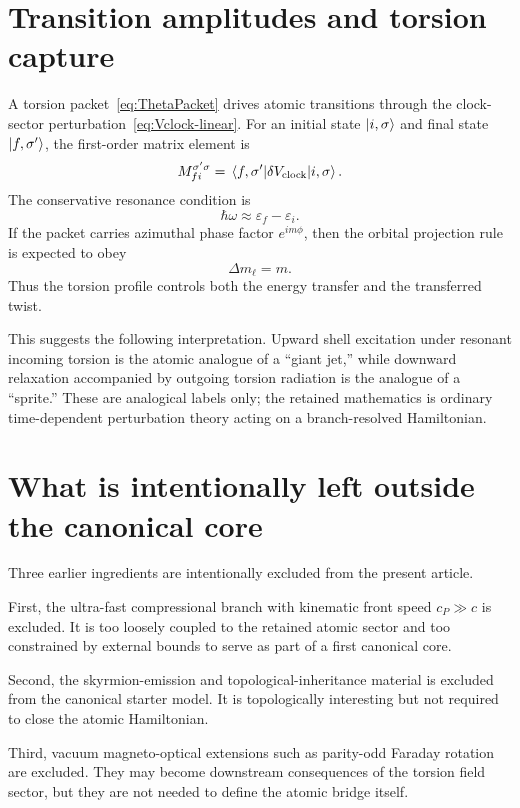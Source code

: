 \documentclass[11pt,a4paper]{article}
\begin{document}
\section{Transition amplitudes and torsion capture}
A torsion packet~\eqref{eq:ThetaPacket} drives atomic transitions through the clock-sector perturbation~\eqref{eq:Vclock-linear}. For an initial state $\ket{i,\sigma}$ and final state $\ket{f,\sigma'}$, the first-order matrix element is
\begin{equation}
\label{eq:Mfi}
M_{fi}^{\sigma'\sigma}=\matrixel{f,\sigma'}{\delta V_{\rm clock}}{i,\sigma}.
\end{equation}
The conservative resonance condition is
\begin{equation}
\label{eq:resonance}
\hbar\omega \approx \varepsilon_f-\varepsilon_i.
\end{equation}
If the packet carries azimuthal phase factor $e^{im\phi}$, then the orbital projection rule is expected to obey
\begin{equation}
\label{eq:dm}
\Delta m_\ell = m.
\end{equation}
Thus the torsion profile controls both the energy transfer and the transferred twist.

This suggests the following interpretation. Upward shell excitation under resonant incoming torsion is the atomic analogue of a ``giant jet,'' while downward relaxation accompanied by outgoing torsion radiation is the analogue of a ``sprite.'' These are analogical labels only; the retained mathematics is ordinary time-dependent perturbation theory acting on a branch-resolved Hamiltonian.

\section{What is intentionally left outside the canonical core}
Three earlier ingredients are intentionally excluded from the present article.

First, the ultra-fast compressional branch with kinematic front speed $c_P\gg c$ is excluded. It is too loosely coupled to the retained atomic sector and too constrained by external bounds to serve as part of a first canonical core.

Second, the skyrmion-emission and topological-inheritance material is excluded from the canonical starter model. It is topologically interesting but not required to close the atomic Hamiltonian.

Third, vacuum magneto-optical extensions such as parity-odd Faraday rotation are excluded. They may become downstream consequences of the torsion field sector, but they are not needed to define the atomic bridge itself.
\end{document}
